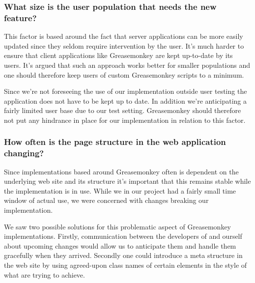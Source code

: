 \subsubsection{What size is the user population that needs the new feature?}

This factor is based around the fact that server applications can be more
easily updated since they seldom require intervention by the user. It's
much harder to ensure that client applications like Greasemonkey are
kept up-to-date by its users. It's argued that such an approach works
better for smaller populations and one should therefore keep users
of custom Greasemonkey scripts to a minimum.

Since we're not foreseeing the use of our implementation outside user
testing the application does not have to be kept up to date. In addition
we're anticipating a fairly limited user base due to our test setting.
Greasemonkey should therefore not put any hindrance in place for
our implementation in relation to this factor.

\subsubsection{How often is the page structure in the web application
  changing?}

Since implementations based around Greasemonkey often is dependent on the
underlying web site and its structure it's important that this remains
stable while the implementation is in use. While we in our project
had a fairly small time window of actual use, we were concerned
with changes breaking our implementation.

We saw two possible solutions for this problematic aspect of Greasemonkey
implementations. Firstly, communication between the developers of
\urort{} and ourself about upcoming changes would allow us to anticipate
them and handle them gracefully when they arrived. Secondly one could
introduce a meta structure in the web site by using agreed-upon
class names of certain  elements in the style of
what %
are trying to achieve.

